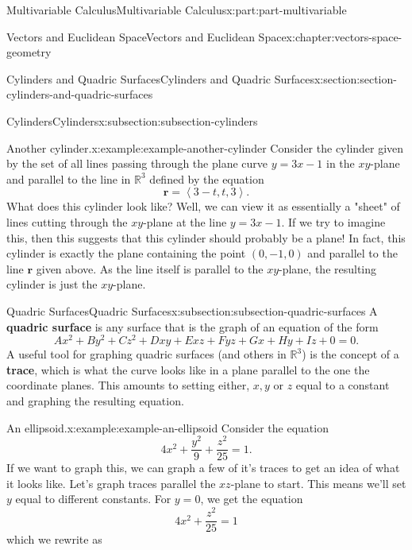 \documentclass[twoside,10pt,]{book}
\newcommand{\terminology}[1]{\textbf{#1}}
\numberwithin{equation}{part}
\newcommand{\RR}{\mathbb{R}}
\newcommand{\dotprod}[1]{\left\langle #1 \right\rangle}
\begin{document}
\begin{partptx}{Multivariable Calculus}{}{Multivariable Calculus}{}{}{x:part:part-multivariable}
\begin{chapterptx}{Vectors and Euclidean Space}{}{Vectors and Euclidean Space}{}{}{x:chapter:vectors-space-geometry}
\begin{sectionptx}{Cylinders and Quadric Surfaces}{}{Cylinders and Quadric Surfaces}{}{}{x:section:section-cylinders-and-quadric-surfaces}
\begin{subsectionptx}{Cylinders}{}{Cylinders}{}{}{x:subsection:subsection-cylinders}
\begin{example}{Another cylinder.}{x:example:example-another-cylinder}%
Consider the cylinder given by the set of all lines passing through the plane curve \(y = 3x-1\) in the \(xy\)-plane and parallel to the line in \(\RR^{3}\) defined by the equation%
%
\begin{equation*}
\mathbf{r} = \dotprod{3-t,t,3}.
\end{equation*}
What does this cylinder look like? Well, we can view it as essentially a "sheet" of lines cutting through the \(xy\)-plane at the line \(y = 3x-1\). If we try to imagine this, then this suggests that this cylinder should probably be a plane! In fact, this cylinder is exactly the plane containing the point \((0,-1,0)\) and parallel to the line \(\mathbf{r}\) given above. As the line itself is parallel to the \(xy\)-plane, the resulting cylinder is just the \(xy\)-plane.%
\end{example}
\end{subsectionptx}
%
%
\typeout{************************************************}
\typeout{************************************************}
%
\begin{subsectionptx}{Quadric Surfaces}{}{Quadric Surfaces}{}{}{x:subsection:subsection-quadric-surfaces}
A \terminology{quadric surface} is any surface that is the graph of an equation of the form%
%
\begin{equation*}
Ax^{2}+By^{2}+Cz^{2}+Dxy+Exz+Fyz+Gx+Hy+Iz+0 = 0.
\end{equation*}
A useful tool for graphing quadric surfaces (and others in \(\RR^{3}\)) is the concept of a \terminology{trace}, which is what the curve looks like in a plane parallel to the one the coordinate planes. This amounts to setting either, \(x,y\) or \(z\) equal to a constant and graphing the resulting equation.%
\begin{example}{An ellipsoid.}{x:example:example-an-ellipsoid}%
Consider the equation%
%
\begin{equation*}
4x^{2}+\frac{y^{2}}{9}+\frac{z^{2}}{25} = 1.
\end{equation*}
If we want to graph this, we can graph a few of it's traces to get an idea of what it looks like. Let's graph traces parallel the \(xz\)-plane to start. This means we'll set \(y\) equal to different constants. For \(y=0\), we get the equation%
%
\begin{equation*}
4x^{2}+\frac{z^{2}}{25} = 1
\end{equation*}
which we rewrite as%

\end{example}
\end{subsectionptx}
\end{sectionptx}
\end{chapterptx}
\end{partptx}
\end{document}
